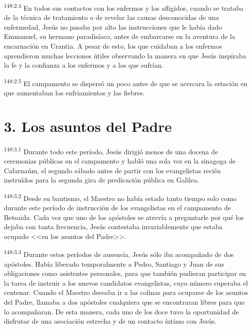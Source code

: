 \par 
\textsuperscript{148:2.4} En todos sus contactos con los enfermos y los afligidos, cuando se trataba de la técnica de tratamiento o de revelar las causas desconocidas de una enfermedad, Jesús no pasaba por alto las instrucciones que le había dado Emmanuel, su hermano paradisíaco, antes de embarcarse en la aventura de la encarnación en Urantia. A pesar de esto, los que cuidaban a los enfermos aprendieron muchas lecciones útiles observando la manera en que Jesús inspiraba la fe y la confianza a los enfermos y a los que sufrían.

\par 
\textsuperscript{148:2.5} El campamento se dispersó un poco antes de que se acercara la estación en que aumentaban los enfriamientos y las fiebres.

\section*{3. Los asuntos del Padre}
\par 
\textsuperscript{148:3.1} Durante todo este período, Jesús dirigió menos de una docena de ceremonias públicas en el campamento y habló una sola vez en la sinagoga de Cafarnaúm, el segundo sábado antes de partir con los evangelistas recién instruídos para la segunda gira de predicación pública en Galilea.

\par 
\textsuperscript{148:3.2} Desde su bautismo, el Maestro no había estado tanto tiempo solo como durante este período de instrucción de los evangelistas en el campamento de Betsaida. Cada vez que uno de los apóstoles se atrevía a preguntarle por qué los dejaba con tanta frecuencia, Jesús contestaba invariablemente que estaba ocupado <<en los asuntos del Padre>>.

\par 
\textsuperscript{148:3.3} Durante estos períodos de ausencia, Jesús sólo iba acompañado de dos apóstoles. Había liberado temporalmente a Pedro, Santiago y Juan de sus obligaciones como asistentes personales, para que también pudieran participar en la tarea de instruir a los nuevos candidatos evangelistas, cuyo número superaba el centenar. Cuando el Maestro deseaba ir a las colinas para ocuparse de los asuntos del Padre, llamaba a dos apóstoles cualquiera que se encontraran libres para que lo acompañaran. De esta manera, cada uno de los doce tuvo la oportunidad de disfrutar de una asociación estrecha y de un contacto íntimo con Jesús.

